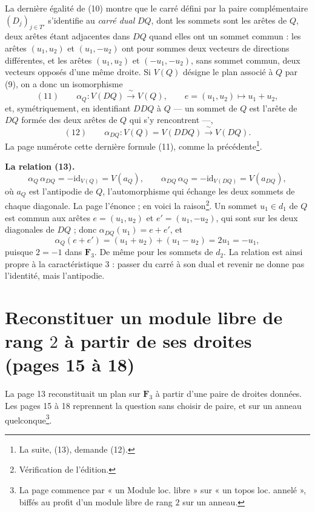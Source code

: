\documentclass[11pt,a4paper]{article}
\begin{document}
La dernière égalité de (10) montre que le carré défini par la paire
complémentaire $(D_j)_{j \in T'}$ s'identifie au \emph{carré dual} $DQ$, dont les
sommets sont les arêtes de $Q$, deux arêtes étant adjacentes dans $DQ$ quand elles
ont un sommet commun : les arêtes $(u_1, u_2)$ et $(u_1, -u_2)$ ont pour sommes
deux vecteurs de directions différentes, et les arêtes $(u_1, u_2)$ et
$(-u_1, -u_2)$, sans sommet commun, deux vecteurs opposés d'une même droite. Si
$V(Q)$ désigne le plan associé à $Q$ par (9), on a donc un isomorphisme
\[
(11) \qquad \alpha_Q : V(DQ) \xrightarrow{\ \sim\ } V(Q), \qquad e = (u_1, u_2) \longmapsto u_1 + u_2 ,
\]
et, symétriquement, en identifiant $DDQ$ à $Q$ — un sommet de $Q$ est l'arête de
$DQ$ formée des deux arêtes de $Q$ qui s'y rencontrent —,
\[
(12) \qquad \alpha_{DQ} : V(Q) = V(DDQ) \xrightarrow{\ \sim\ } V(DQ) .
\]
La page numérote cette dernière formule (11), comme la précédente\footnote{La
suite, (13), demande (12).}.

\textbf{La relation (13).}
\[
\alpha_Q\, \alpha_{DQ} = -\mathrm{id}_{V(Q)} = V(a_Q),
\qquad \alpha_{DQ}\, \alpha_Q = -\mathrm{id}_{V(DQ)} = V(a_{DQ}),
\]
où $a_Q$ est l'antipodie de $Q$, l'automorphisme qui échange les deux sommets de
chaque diagonale. La page l'énonce ; en voici la raison\footnote{Vérification de
l'édition.}. Un sommet $u_1 \in d_1$ de $Q$ est commun aux arêtes $e = (u_1, u_2)$
et $e' = (u_1, -u_2)$, qui sont sur les deux diagonales de $DQ$ ; donc
$\alpha_{DQ}(u_1) = e + e'$, et
\[
\alpha_Q(e + e') = (u_1 + u_2) + (u_1 - u_2) = 2u_1 = -u_1 ,
\]
puisque $2 = -1$ dans $\mathbf{F}_3$. De même pour les sommets de $d_2$. La relation
est ainsi propre à la caractéristique $3$ : passer du carré à son dual et revenir
ne donne pas l'identité, mais l'antipodie.

\section*{Reconstituer un module libre de rang $2$ à partir de ses droites (pages 15 à 18)}

La page 13 reconstituait un plan sur $\mathbf{F}_3$ à partir d'une paire de droites
données. Les pages 15 à 18 reprennent la question sans choisir de paire, et sur
un anneau quelconque\footnote{La page commence par « un Module loc. libre » sur
« un topos loc. annelé », biffés au profit d'un module libre de rang $2$ sur un
anneau.}.
\end{document}
